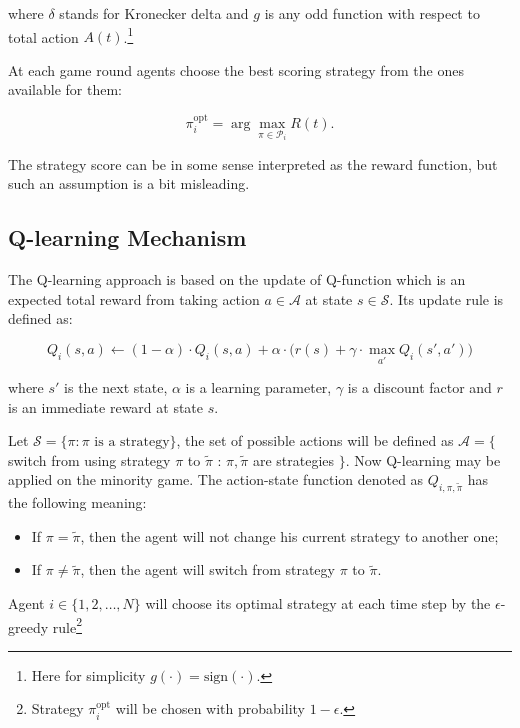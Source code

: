 \documentclass[12pt,american,czech]{article}
\begin{document}
\noindent
where $\delta$ stands for Kronecker delta and $g$ is any odd function with respect to total action $A(t)$.\footnote{Here for simplicity $g(\cdot)=\text{sign}(\cdot)$.} 

At each game round agents choose the best scoring strategy from the ones available for them:

\begin{equation}
\pi_{i}^{\text{opt}} = \arg \max_{\pi\in\mathcal{P}_{i}} R(t).
\end{equation}

The strategy score can be in some sense interpreted as the reward function, but such an assumption is a bit misleading. 

\subsection{Q-learning Mechanism}\label{subsec:q}

The Q-learning approach is based on the update of Q-function which is an expected total reward from taking action $a\in\mathcal{A}$ at state $s\in\mathcal{S}$. Its update rule is defined as:

\begin{equation}
Q_{i}(s,a)\leftarrow(1-\alpha)\cdot Q_{i}(s,a)+\alpha\cdot\big(r(s)+\gamma\cdot\max_{a'}Q_{i}(s',a')\big)
\end{equation}

\noindent
where $s'$ is the next state, $\alpha$ is a learning parameter, $\gamma$ is a discount factor and $r$ is an immediate reward at state $s$.

Let $\mathcal{S}=\{\pi: \pi \text{ is a strategy}\}$, the set of possible actions will be defined as $\mathcal{A}=\{$switch from using strategy $\pi$ to $\tilde{\pi}$ : $\pi,\tilde{\pi}$ are strategies $\}$. Now Q-learning may be applied on the minority game. The action-state function denoted as $Q_{i,\pi,\tilde{\pi}}$ has the following meaning:

\begin{itemize}
\item If $\pi=\tilde{\pi}$, then the agent will not change his current strategy to another one;
\item If $\pi\neq\tilde{\pi}$, then the agent will switch from strategy $\pi$ to $\tilde{\pi}$.
\end{itemize}

Agent $i\in\{1,2,\dots,N\}$ will choose its optimal strategy at each time step by the $\epsilon$-greedy rule\footnote{Strategy $\pi_{i}^{\text{opt}}$ will be chosen with probability $1-\epsilon$.}
\end{document}

